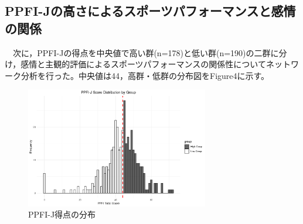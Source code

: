 \documentclass[12pt,a4paper,xelatex,ja=standard]{bxjsarticle}
\begin{document}
\hypertarget{ppfi-jux306eux9ad8ux3055ux306bux3088ux308bux30b9ux30ddux30fcux30c4ux30d1ux30d5ux30a9ux30fcux30deux30f3ux30b9ux3068ux611fux60c5ux306eux95a2ux4fc2}{%
\subsection{PPFI-Jの高さによるスポーツパフォーマンスと感情の関係}\label{ppfi-jux306eux9ad8ux3055ux306bux3088ux308bux30b9ux30ddux30fcux30c4ux30d1ux30d5ux30a9ux30fcux30deux30f3ux30b9ux3068ux611fux60c5ux306eux95a2ux4fc2}}

　次に，PPFI-Jの得点を中央値で高い群(n=178)と低い群(n=190)の二群に分け，感情と主観的評価によるスポーツパフォーマンスの関係性についてネットワーク分析を行った。中央値は44，高群・低群の分布図をFigure4に示す。

\begin{figure}[H]
\centering
\includegraphics[clip,width = 8cm]{Figure4.png}
\caption{PPFI-J得点の分布}
\end{figure}
\end{document}
